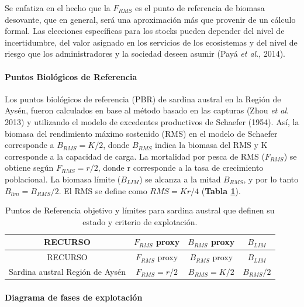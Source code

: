 \documentclass[
  spanish,
]{article}
\begin{document}
Se enfatiza en el hecho que la \(F_{RMS}\) es el punto de referencia de
biomasa desovante, que en general, será una aproximación más que
provenir de un cálculo formal. Las elecciones específicas para los
stocks pueden depender del nivel de incertidumbre, del valor asignado en
los servicios de los ecosistemas y del nivel de riesgo que los
administradores y la sociedad deseen asumir (Payá \emph{et al}., 2014).

\hypertarget{puntos-bioluxf3gicos-de-referencia}{%
\paragraph{Puntos Biológicos de
Referencia}\label{puntos-bioluxf3gicos-de-referencia}}

\quad

Los puntos biológicos de referencia (PBR) de sardina austral en la
Región de Aysén, fueron calculados en base al método basado en las
capturas (Zhou \emph{et al}. 2013) y utilizando el modelo de excedentes
productivos de Schaefer (1954). Así, la biomasa del rendimiento máximo
sostenido (RMS) en el modelo de Schaefer corresponde a \(B_{RMS}=K/2\),
donde \(B_{RMS}\) indica la biomasa del RMS y K corresponde a la
capacidad de carga. La mortalidad por pesca de RMS (\(F_{RMS}\)) se
obtiene según \(F_{RMS}=r/2\), donde r corresponde a la tasa de
crecimiento poblacional. La biomasa límite (\(B_{LIM}\)) se alcanza a la
mitad \(B_{RMS}\), y por lo tanto \(B_{lím}= B_{RMS}/2\). El RMS se
define como \(RMS=Kr/4\) (\textbf{Tabla \ref{Tab4}}).

\vspace{0.8cm}

\begin{longtable}[]{@{}cccc@{}}
\caption{\label{Tab4} Puntos de Referencia objetivo y límites para
sardina austral que definen su estado y criterio de
explotación.}\tabularnewline
\toprule
RECURSO & \(F_{RMS}\) proxy & \(B_{RMS}\) proxy &
\(B_{LIM}\)\tabularnewline
\midrule
\endfirsthead
\toprule
RECURSO & \(F_{RMS}\) proxy & \(B_{RMS}\) proxy &
\(B_{LIM}\)\tabularnewline
\midrule
\endhead
Sardina austral Región de Aysén & \(F_{RMS} = r/2\) & \(B_{RMS}=K/2\) &
\(B_{RMS}/2\)\tabularnewline
\bottomrule
\end{longtable}

\vspace{0.5cm}

\hypertarget{diagrama-de-fases-de-explotaciuxf3n}{%
\paragraph{Diagrama de fases de
explotación}\label{diagrama-de-fases-de-explotaciuxf3n}}
\end{document}
